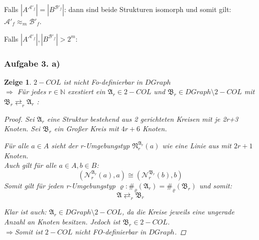 \documentclass[12pt]{article}
\newtheorem{zeige}{Zeige}
\begin{document}
Falls $|A^{ \mathcal{A}'_f }|=|B^{ \mathcal{B}'_f }|$: dann sind beide Strukturen isomorph und somit gilt: $\mathcal{A}'_f \approx_m \mathcal{B}'_f$.

Falls $|A^{ \mathcal{A}'_f }|,|B^{ \mathcal{B}'_f }| > 2^m$:









\subsubsection*{Aufgabe 3. a)}
\begin{zeige}
  $2-COL$ ist nicht Fo-definierbar in $DGraph$\\
  $\Rightarrow$ Für jedes $r\in\mathbb{N}$ exestiert ein $\mathfrak{A}_r \in  2-COL$ und $\mathfrak{B}_r \in DGraph \setminus 2-COL$ mit $\mathfrak{B}_r\rightleftarrows_r \mathfrak{A}_r$ :\\
  
  \begin{proof}
    
    Sei $\mathfrak{A}_r$ eine Struktur bestehend aus 2 gerichteten Kreisen mit je 2r+3 Knoten.
    Sei $\mathfrak{B}_r$ ein Großer Kreis mit $4r+6$ Knoten.

    Für alle $a\in A$ sieht der r-Umgebungstyp $\mathfrak{N}_r^{\mathfrak{A}_r}(a)$ wie eine Linie aus mit $2r+1$ Knoten.\\
    Auch gilt für alle $a\in A, b\in B$: 
    $$(\mathcal{N}_r^{\mathfrak{A}_r}(a),a) \cong (\mathcal{N}_r^{\mathfrak{B}_r}(b),b)$$
    Somit gilt für jeden r-Umgebungstyp $\varrho: \#_\varrho(\mathfrak{A}_r)=\#_\varrho(\mathfrak{B}_r)$ und somit: $$\mathfrak{A}\rightleftarrows_r \mathfrak{B}_r$$
    
    Klar ist auch: $\mathfrak{A}_r\in DGraph\setminus 2-COL$, da die Kreise jeweils eine ungerade Anzahl an Knoten besitzen. Jedoch ist $\mathfrak{B}_r\in 2-COL$.\\
    $\Rightarrow $Somit ist $2-COL$ nicht FO-definierbar in $DGraph$.
  \end{proof}
\end{zeige}
\end{document}
